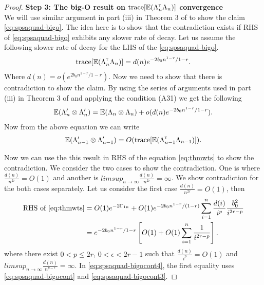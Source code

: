 \begin{proof}
\noindent\textbf{Step 3: The big-O result on $\text{trace}[\mathbb{E} (\Lambda_n ^\mathsf{\scriptscriptstyle T} \Lambda_n)]$ convergence} \\
We will use similar argument in part (iii) in Theorem 3 of \cite{spall-jacobian} to show the claim \eqref{eq:spsaquad-bigo}. The idea here is to show that the contradiction exists if RHS of \eqref{eq:spsaquad-bigo} exhibits  any slower rate of decay. Let us assume the following slower rate of decay for the LHS of the \eqref{eq:spsaquad-bigo}.
\begin{align}
\text{trace}[\mathbb{E} (\Lambda_n ^\mathsf{\scriptscriptstyle T} \Lambda_n)] = d(n) e^{-2b_0n^{1-r} / {1-r}}.
\label{eq:spsaquad-bigocont}
\end{align}
Where $d(n) = o(e^{2b_0n^{1-r} / {1-r}})$. Now we need to show that there is contradiction to show the claim. By using the series of arguments used in part (iii) in Theorem 3 of \cite{spall-jacobian} and applying the condition (A31) we get the following 
\begin{align}
\mathbb{E} (\Lambda_{n}' \otimes \Lambda_{n}') = \mathbb{E} (\Lambda_{n} \otimes \Lambda_{n}) + o(d(n) e^{-2b_0n^{1-r} / {1-r}}).
\label{eq:spsaquad-bigocont2}
\end{align}
Now from the above equation we can write 
\begin{align}
\mathbb{E} (\Lambda_{n-1}' \otimes \Lambda_{n-1}') = O (\text{trace}[\mathbb{E} (\Lambda_{n-1} ^\mathsf{\scriptscriptstyle T} \Lambda_{n-1})]). 
\label{eq:spsaquad-bigocont3}
\end{align}

Now we can use the this result in RHS of the equation \eqref{eq:thmwts} to show the contradiction. We consider the two cases to show the contradiction. One is where $\frac{d(n)}{n^{2r}} = O(1)$ and another is $lim sup_{n \to \infty} \frac{d(n)}{n^{2r}} = \infty$. We show contradiction for the both cases separately. Let us consider the first case $\frac{d(n)}{n^{2r}} = O(1)$, then
\begin{align}
\text{RHS of \eqref{eq:thmwts}} &= O(1) e^{-2 \Gamma_{1n}} +  O(1) e^{-2 b_0 n^{1-r}/(1-r)} \sum_{i=1}^n \frac{d(i)}{i^{p}} \frac{b_0^2}{i^{2r-p}}\nonumber \\
&= e^{-2b_0n^{1-r} / {1-r}} \left[ O(1) + O(1) \sum_{i =1}^n \frac{1}{i^{2r-p}}\right].
\label{eq:spsaquad-bigocont4}
\end{align}
where there exist  $0 < p \le 2r$, $0 < \epsilon < 2r -1$ such that $\frac{d(n)}{i^{p}} = O(1)$ and $lim sup_{n \to \infty} \frac{d(n)}{n^{p-\epsilon}} = \infty$. In \eqref{eq:spsaquad-bigocont4}, the first equality uses \eqref{eq:spsaquad-bigocont} and \eqref{eq:spsaquad-bigocont3}.


\end{proof}
